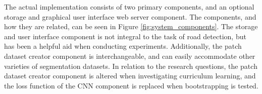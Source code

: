 The actual implementation consists of two primary components, and an optional storage and graphical user interface web server component. The components, and how they are related, can be seen in Figure \ref{fig:system_components}. The storage and user interface component is not integral to the task of road detection, but has been a helpful aid when conducting experiments. Additionally, the patch dataset creator component is interchangeable, and can easily accommodate other varieties of segmentation datasets. In relation to the research questions, the patch dataset creator component is altered when investigating curriculum learning, and the loss function of the \ac{CNN} component is replaced when bootstrapping is tested. \\


